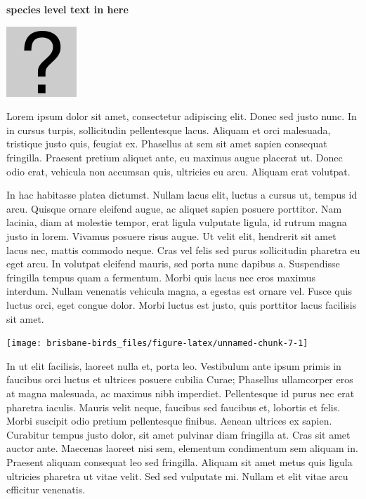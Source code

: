 \documentclass[]{book}
\let\origfigure\figure
\let\endorigfigure\endfigure
\renewenvironment{figure}[1][2] {
  \expandafter\origfigure\expandafter[H]
} {
  \endorigfigure
}
\begin{document}
\textbf{species level text in here}

\begin{figure}
\centering
\includegraphics{assets/missing.png}
\caption{No image for species}
\end{figure}

Lorem ipsum dolor sit amet, consectetur adipiscing elit. Donec sed justo
nunc. In in cursus turpis, sollicitudin pellentesque lacus. Aliquam et
orci malesuada, tristique justo quis, feugiat ex. Phasellus at sem sit
amet sapien consequat fringilla. Praesent pretium aliquet ante, eu
maximus augue placerat ut. Donec odio erat, vehicula non accumsan quis,
ultricies eu arcu. Aliquam erat volutpat.

In hac habitasse platea dictumst. Nullam lacus elit, luctus a cursus ut,
tempus id arcu. Quisque ornare eleifend augue, ac aliquet sapien posuere
porttitor. Nam lacinia, diam at molestie tempor, erat ligula vulputate
ligula, id rutrum magna justo in lorem. Vivamus posuere risus augue. Ut
velit elit, hendrerit sit amet lacus nec, mattis commodo neque. Cras vel
felis sed purus sollicitudin pharetra eu eget arcu. In volutpat eleifend
mauris, sed porta nunc dapibus a. Suspendisse fringilla tempus quam a
fermentum. Morbi quis lacus nec eros maximus interdum. Nullam venenatis
vehicula magna, a egestas est ornare vel. Fusce quis luctus orci, eget
congue dolor. Morbi luctus est justo, quis porttitor lacus facilisis sit
amet.

\begin{figure}
\texttt{[image: brisbane-birds\_files/figure-latex/unnamed-chunk-7-1]} \caption{insert figure caption}\label{fig:unnamed-chunk-7}
\end{figure}

In ut elit facilisis, laoreet nulla et, porta leo. Vestibulum ante ipsum
primis in faucibus orci luctus et ultrices posuere cubilia Curae;
Phasellus ullamcorper eros at magna malesuada, ac maximus nibh
imperdiet. Pellentesque id purus nec erat pharetra iaculis. Mauris velit
neque, faucibus sed faucibus et, lobortis et felis. Morbi suscipit odio
pretium pellentesque finibus. Aenean ultrices ex sapien. Curabitur
tempus justo dolor, sit amet pulvinar diam fringilla at. Cras sit amet
auctor ante. Maecenas laoreet nisi sem, elementum condimentum sem
aliquam in. Praesent aliquam consequat leo sed fringilla. Aliquam sit
amet metus quis ligula ultricies pharetra ut vitae velit. Sed sed
vulputate mi. Nullam et elit vitae arcu efficitur venenatis.
\end{document}
